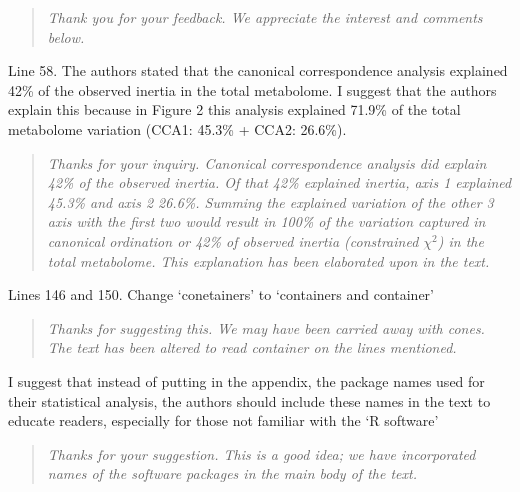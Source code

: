 \documentclass{article}
\begin{document}
\begin{quote}
    \textit{Thank you for your feedback.  We appreciate the interest and comments below.}
\end{quote}

Line 58. The authors stated that the canonical correspondence analysis explained 42\% of the observed inertia in the total metabolome. I suggest that the authors explain this because in Figure 2 this analysis explained 71.9\% of the total metabolome variation (CCA1: 45.3\% + CCA2: 26.6\%).

\begin{quote}
  \textit{Thanks for your inquiry.  Canonical correspondence analysis did explain 42\% of the observed inertia.  Of that 42\% explained inertia, axis 1 explained 45.3\% and axis 2 26.6\%.  Summing the explained variation of the other 3 axis with the first two would result in 100\% of the variation captured in canonical ordination or 42\% of observed inertia (constrained $\chi^2$) in the total metabolome. This explanation has been elaborated upon in the text.   } 
\end{quote}

Lines 146 and 150. Change ‘conetainers’ to ‘containers and container’

\begin{quote}
    \textit{Thanks for suggesting this.  We may have been carried away with cones.  The text has been altered to read container on the lines mentioned.  }
\end{quote}

I suggest that instead of putting in the appendix, the package names used for their statistical analysis, the authors should include these names in the text to educate readers, especially for those not familiar with the ‘R software’

\begin{quote}
    \textit{Thanks for your suggestion.  This is a good idea; we have incorporated names of the software packages in the main body of the text.}
\end{quote}
\end{document}
